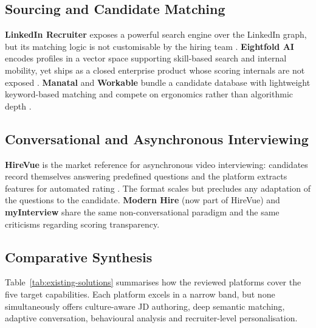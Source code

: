 \subsection{Sourcing and Candidate Matching}
\textbf{LinkedIn Recruiter} exposes a powerful search engine over the
LinkedIn graph, but its matching logic is not customisable by the hiring
team . \textbf{Eightfold AI} encodes profiles in
a vector space supporting skill-based search and internal mobility, yet
ships as a closed enterprise product whose scoring internals are not
exposed . \textbf{Manatal} and \textbf{Workable} bundle
a candidate database with lightweight keyword-based matching and compete on
ergonomics rather than algorithmic depth .

\subsection{Conversational and Asynchronous Interviewing}
\textbf{HireVue} is the market reference for asynchronous video
interviewing: candidates record themselves answering predefined questions
and the platform extracts features for automated rating .
The format scales but precludes any adaptation of the questions to the
candidate. \textbf{Modern Hire} (now part of HireVue) and
\textbf{myInterview} share the same non-conversational paradigm and the
same criticisms regarding scoring transparency.

\subsection{Comparative Synthesis}
Table~\ref{tab:existing-solutions} summarises how the reviewed platforms
cover the five target capabilities. Each platform excels in a narrow band,
but none simultaneously offers culture-aware JD authoring, deep semantic
matching, adaptive conversation, behavioural analysis and recruiter-level
personalisation.

